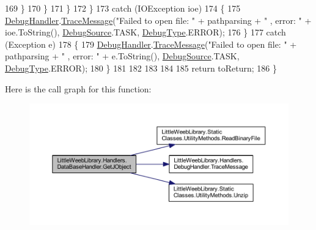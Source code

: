 \begin{DoxyCode}
169                         \}
170                     \}
171                 \}
172             \}
173             \textcolor{keywordflow}{catch} (IOException ioe)
174             \{
175                 \mbox{\hyperlink{class_little_weeb_library_1_1_handlers_1_1_data_base_handler_aa474a1f934032623ffb3ae5eb156148b}{DebugHandler}}.\mbox{\hyperlink{interface_little_weeb_library_1_1_handlers_1_1_i_debug_handler_a2e405bc3492e683cd3702fae125221bc}{TraceMessage}}(\textcolor{stringliteral}{"Failed to open file: "} + pathparsing + \textcolor{stringliteral}{"
      , error: "} + ioe.ToString(), \mbox{\hyperlink{namespace_little_weeb_library_1_1_handlers_a2a6ca0775121c9c503d58aa254d292be}{DebugSource}}.TASK, \mbox{\hyperlink{namespace_little_weeb_library_1_1_handlers_ab66019ed40462876ec4e61bb3ccb0a62}{DebugType}}.ERROR);
176             \}
177             \textcolor{keywordflow}{catch} (Exception e)
178             \{
179                 \mbox{\hyperlink{class_little_weeb_library_1_1_handlers_1_1_data_base_handler_aa474a1f934032623ffb3ae5eb156148b}{DebugHandler}}.\mbox{\hyperlink{interface_little_weeb_library_1_1_handlers_1_1_i_debug_handler_a2e405bc3492e683cd3702fae125221bc}{TraceMessage}}(\textcolor{stringliteral}{"Failed to open file: "} + pathparsing + \textcolor{stringliteral}{"
      , error: "} + e.ToString(), \mbox{\hyperlink{namespace_little_weeb_library_1_1_handlers_a2a6ca0775121c9c503d58aa254d292be}{DebugSource}}.TASK, \mbox{\hyperlink{namespace_little_weeb_library_1_1_handlers_ab66019ed40462876ec4e61bb3ccb0a62}{DebugType}}.ERROR);
180             \}
181 
182 
183             
184 
185             \textcolor{keywordflow}{return} toReturn;
186         \}
\end{DoxyCode}
Here is the call graph for this function\+:\nopagebreak
\begin{figure}[H]
\begin{center}
\leavevmode
\includegraphics[width=350pt]{class_little_weeb_library_1_1_handlers_1_1_data_base_handler_a4d7ed521cd4bedc0d650bc01afc67587_cgraph}
\end{center}
\end{figure}
\mbox{\label{class_little_weeb_library_1_1_handlers_1_1_data_base_handler_a7821535a003c7675c09ba846bd9502ca}} 
